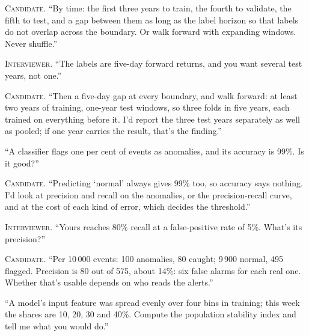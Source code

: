 \noindent\textsc{Candidate.} ``By time: the first three years to train, the fourth to validate, the fifth to test, and a gap
between them as long as the label horizon so that labels do not overlap across the boundary. Or walk forward with expanding
windows. Never shuffle.''


\noindent\textsc{Interviewer.} ``The labels are five-day forward returns, and you want several test years, not one.''

\noindent\textsc{Candidate.} ``Then a five-day gap at every boundary, and walk forward: at least two years of training, one-year test
windows, so three folds in five years, each trained on everything before it. I'd report the three test years separately as well as
pooled; if one year carries the result, that's the finding.''


\begin{interviewq}\label{iq:iv:mock-interviews:11}
``A classifier flags one per cent of events as anomalies, and its accuracy is 99\%. Is it good?''
\end{interviewq}

\noindent\textsc{Candidate.} ``Predicting `normal' always gives 99\% too, so accuracy says nothing. I'd look at precision and
recall on the anomalies, or the precision-recall curve, and at the cost of each kind of error, which decides the threshold.''


\noindent\textsc{Interviewer.} ``Yours reaches 80\% recall at a false-positive rate of 5\%. What's its precision?''

\noindent\textsc{Candidate.} ``Per 10\,000 events: 100 anomalies, 80 caught; 9\,900 normal, 495 flagged. Precision is 80 out of 575,
about 14\%: six false alarms for each real one. Whether that's usable depends on who reads the alerts.''


\begin{interviewq}\label{iq:iv:mock-interviews:12}
``A model's input feature was spread evenly over four bins in training; this week the shares are 10, 20, 30 and 40\%. Compute the
population stability index and tell me what you would do.''
\end{interviewq}

